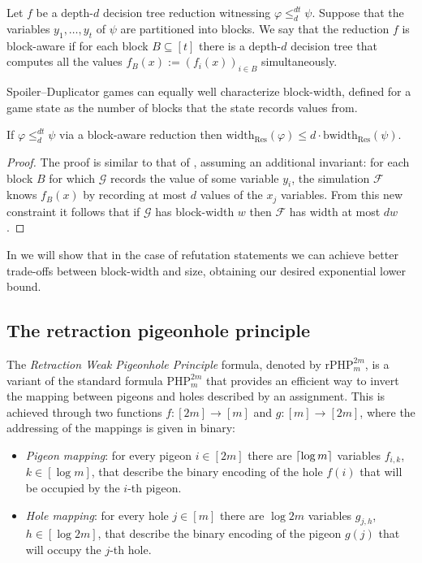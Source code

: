 \begin{definition}
    Let $f$ be a depth-$d$ decision tree reduction witnessing $\varphi \leq_d^{dt} \psi$. Suppose that the variables $y_1, \ldots, y_t$ of $\psi$ are partitioned into blocks. We say that the reduction $f$ is block-aware if for each block $B \subseteq [t]$ there is a depth-$d$ decision tree that computes all the values $f_{B}(x) := (f_i(x))_{i \in B}$ simultaneously.
\end{definition}

Spoiler--Duplicator games can equally well characterize block-width, defined for a game state as the number of blocks that the state records values from.

\begin{proposition}
    \label{prop:block_reduction}
    If $\varphi \leq^{dt}_d \psi$ via a block-aware reduction then $\mathrm{width}_{\mathrm{Res}}(\varphi) \leq d \cdot \mathrm{bwidth}_{\mathrm{Res}}(\psi)$.
\end{proposition}

\begin{proof}
    The proof is similar to that of , assuming an additional invariant: for each block $B$ for which $\mathcal{G}$ records the value of some variable $y_i$, the simulation $\mathcal{F}$ knows $f_B(x)$ by recording at most $d$ values of the $x_j$ variables. From this new constraint it follows that if $\mathcal{G}$ has block-width $w$ then $\mathcal{F}$ has width at most $dw$.
\end{proof}

In  we will show that in the case of refutation statements we can achieve better trade-offs between block-width and size, obtaining our desired exponential lower bound.

\subsection{The retraction pigeonhole principle}
\label{sec:rPHP}

The \textit{Retraction Weak Pigeonhole Principle} formula, denoted by $\mathrm{rPHP}_{m}^{2m}$, is a variant of the standard formula $\mathrm{PHP}^{2m}_m$ that provides an efficient way to invert the mapping between pigeons and holes described by an assignment. This is achieved through two functions $f : [2m] \to [m]$ and $g : [m] \to [2m]$, where the addressing of the mappings is given in binary:
\begin{itemize}
    \item \textit{Pigeon mapping}: for every pigeon $i \in [2m]$ there are $\left \lceil \log m \right \rceil$ variables $f_{i,k}$, $k \in [\log m]$, that describe the binary encoding of the hole $f(i)$ that will be occupied by the $i$-th pigeon.
    \item \textit{Hole mapping}: for every hole $j \in [m]$ there are $\log 2m$ variables $g_{j,h}$, $h \in [\log 2m]$, that describe the binary encoding of the pigeon $g(j)$ that will occupy the $j$-th hole.
\end{itemize}

